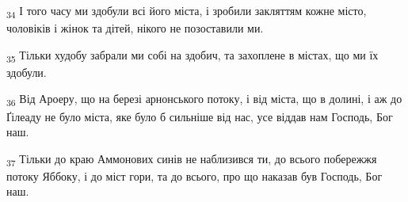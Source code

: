 \begin{tcolorbox}
\textsubscript{34} І того часу ми здобули всі його міста, і зробили закляттям кожне місто, чоловіків і жінок та дітей, нікого не позоставили ми.
\end{tcolorbox}
\begin{tcolorbox}
\textsubscript{35} Тільки худобу забрали ми собі на здобич, та захоплене в містах, що ми їх здобули.
\end{tcolorbox}
\begin{tcolorbox}
\textsubscript{36} Від Ароеру, що на березі арнонського потоку, і від міста, що в долині, і аж до Ґілеаду не було міста, яке було б сильніше від нас, усе віддав нам Господь, Бог наш.
\end{tcolorbox}
\begin{tcolorbox}
\textsubscript{37} Тільки до краю Аммонових синів не наблизився ти, до всього побережжя потоку Яббоку, і до міст гори, та до всього, про що наказав був Господь, Бог наш.
\end{tcolorbox}
